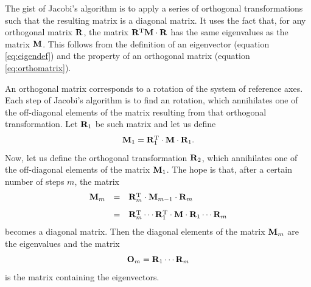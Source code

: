 \documentclass[twoside]{book}
\begin{document}
The gist of Jacobi's algorithm is to apply a series of orthogonal
transformations such that the resulting matrix is a diagonal
matrix. It uses the fact that, for any orthogonal matrix ${\bf
R}$, the matrix ${\bf R}^{\mathop{\rm T}}{\bf M}\cdot{\bf R}$ has the same
eigenvalues as the matrix ${\bf M}$. This follows from the
definition of an eigenvector (equation \ref{eq:eigendef}) and the
property of an orthogonal matrix (equation \ref{eq:orthomatrix}).

An orthogonal matrix corresponds to a rotation of the system of
reference axes. Each step of Jacobi's algorithm is to find an
rotation, which annihilates one of the off-diagonal elements of
the matrix resulting from that orthogonal transformation. Let
${\bf R}_1$ be such matrix and let us define
\begin{equation}
  {\bf M}_1 = {\bf R}^{\mathop{\rm T}}_1\cdot{\bf M}\cdot{\bf R}_1.
\end{equation}
Now, let us define the orthogonal transformation ${\bf R}_2$,
which annihilates one of the off-diagonal elements of the matrix
${\bf M}_1$. The hope is that, after a certain number of steps
$m$, the matrix
\begin{equation}
  \begin{array}{lcl}
    {\bf M}_m & = &{\bf R}^{\mathop{\rm T}}_m\cdot{\bf M}_{m-1}\cdot{\bf
    R}_m\\*[2ex]
      & = &{\bf R}^{\mathop{\rm T}}_m\cdots{\bf R}^{\mathop{\rm T}}_1\cdot{\bf M}\cdot{\bf
      R}_1\cdots{\bf R}_m
  \end{array}
\end{equation}
becomes a diagonal matrix. Then the diagonal elements of the
matrix ${\bf M}_m$ are the eigenvalues and the matrix
\begin{equation}
    {\bf O}_m = {\bf R}_1\cdots{\bf R}_m
\end{equation}
is the matrix containing the eigenvectors.
\end{document}
